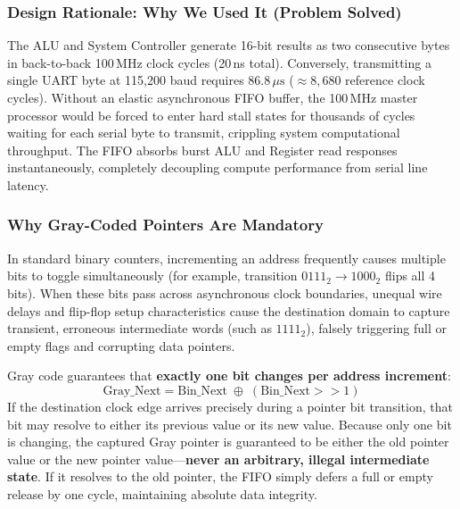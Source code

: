\documentclass[11pt,a4paper]{article}
\begin{document}
\subsubsection{Design Rationale: Why We Used It (Problem Solved)}
The ALU and System Controller generate 16-bit results as two consecutive bytes in back-to-back 100\,MHz clock cycles (20\,ns total). Conversely, transmitting a single UART byte at 115,200 baud requires $86.8\,\mu\text{s}$ ($\approx 8,680$ reference clock cycles). Without an elastic asynchronous FIFO buffer, the 100\,MHz master processor would be forced to enter hard stall states for thousands of cycles waiting for each serial byte to transmit, crippling system computational throughput. The FIFO absorbs burst ALU and Register read responses instantaneously, completely decoupling compute performance from serial line latency.

\subsubsection{Why Gray-Coded Pointers Are Mandatory}
In standard binary counters, incrementing an address frequently causes multiple bits to toggle simultaneously (for example, transition $0111_2 \to 1000_2$ flips all 4 bits). When these bits pass across asynchronous clock boundaries, unequal wire delays and flip-flop setup characteristics cause the destination domain to capture transient, erroneous intermediate words (such as $1111_2$), falsely triggering full or empty flags and corrupting data pointers.

Gray code guarantees that \textbf{exactly one bit changes per address increment}:
\begin{equation}
\text{Gray\_Next} = \text{Bin\_Next} \;\oplus\; (\text{Bin\_Next} \mathbin{>>} 1)
\end{equation}
If the destination clock edge arrives precisely during a pointer bit transition, that bit may resolve to either its previous value or its new value. Because only one bit is changing, the captured Gray pointer is guaranteed to be either the old pointer value or the new pointer value---\textbf{never an arbitrary, illegal intermediate state}. If it resolves to the old pointer, the FIFO simply defers a full or empty release by one cycle, maintaining absolute data integrity.
\end{document}
